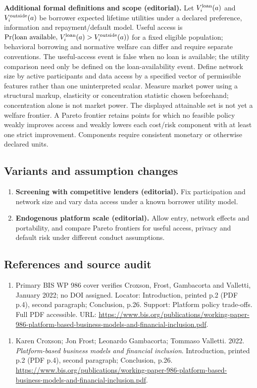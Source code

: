 \documentclass[11pt,a4paper]{article}
\begin{document}
\textbf{Additional formal definitions and scope (editorial).} Let \(V_i^{\rm loan}(a)\) and \(V_i^{\rm outside}(a)\) be borrower expected lifetime utilities under a declared preference, information and repayment/default model. Useful access is \(\Pr(\text{loan available},\,V_i^{\rm loan}(a)>V_i^{\rm outside}(a))\) for a fixed eligible population; behavioral borrowing and normative welfare can differ and require separate conventions. The useful-access event is false when no loan is available; the utility comparison need only be defined on the loan-availability event. Define network size by active participants and data access by a specified vector of permissible features rather than one uninterpreted scalar. Measure market power using a structural markup, elasticity or concentration statistic chosen beforehand; concentration alone is not market power. The displayed attainable set is not yet a welfare frontier. A Pareto frontier retains points for which no feasible policy weakly improves access and weakly lowers each cost/risk component with at least one strict improvement. Components require consistent monetary or otherwise declared units.
\subsection*{Variants and assumption changes}
\begin{enumerate}
\item \textbf{Screening with competitive lenders (editorial).} Fix participation and network size and vary data access under a known borrower utility model.
\item \textbf{Endogenous platform scale (editorial).} Allow entry, network effects and portability, and compare Pareto frontiers for useful access, privacy and default risk under different conduct assumptions.
\end{enumerate}
\subsection*{References and source audit}
\begin{enumerate}
\item Primary BIS WP 986 cover verifies Croxson, Frost, Gambacorta and Valletti, January 2022; no DOI assigned. Locator: Introduction, printed p.2 (PDF p.4), second paragraph; Conclusion, p.26. Support: Platform policy trade-offs. Full PDF accessible. URL: \url{https://www.bis.org/publications/working-paper-986-platform-based-business-models-and-financial-inclusion.pdf}.
\end{enumerate}
\begin{enumerate}\raggedright
\item\hypertarget{definitions:source:30007610:1}{} Karen Croxson; Jon Frost; Leonardo Gambacorta; Tommaso Valletti. 2022. \emph{Platform-based business models and financial inclusion}. Introduction, printed p.2 (PDF p.4), second paragraph; Conclusion, p.26.
\url{https://www.bis.org/publications/working-paper-986-platform-based-business-models-and-financial-inclusion.pdf}.
\end{enumerate}
\end{document}
